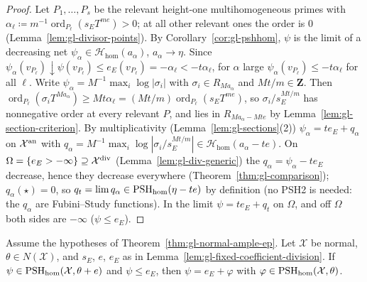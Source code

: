 \begin{proof}
Let $P_1,\dots,P_s$ be the relevant height-one multihomogeneous primes with $\alpha_\ell\coloneqq m^{-1}\operatorname{ord}_{P_\ell}(s_ET^{me})>0$; at all other relevant ones
the order is $0$ (Lemma~\ref{lem:gl-divisor-points}). By Corollary~\ref{cor:gl-pshhom}, $\psi$ is the limit of a decreasing net $\psi_\alpha\in\mathcal
H_{\mathrm{hom}}(a_\alpha)$, $a_\alpha\to\eta$. Since $\psi_\alpha(v_{P_\ell})\downarrow\psi(v_{P_\ell})\le e_E(v_{P_\ell})=-\alpha_\ell<-t\alpha_\ell$, for $\alpha$ large
$\psi_\alpha(v_{P_\ell})\le-t\alpha_\ell$ for all $\ell$. Write $\psi_\alpha=M^{-1}\max_i\log|\sigma_i|$ with $\sigma_i\in R_{Ma_\alpha}$ and $Mt/m\in\mathbf Z$. Then
$\operatorname{ord}_{P_\ell}(\sigma_iT^{Ma_\alpha})\ge Mt\alpha_\ell=(Mt/m)\operatorname{ord}_{P_\ell}(s_ET^{me})$, so $\sigma_i/s_E^{Mt/m}$ has nonnegative order at every relevant
$P$, and lies in $R_{Ma_\alpha-Mte}$ by Lemma~\ref{lem:gl-section-criterion}. By multiplicativity (Lemma~\ref{lem:gl-sections}(2)) $\psi_\alpha=te_E+q_\alpha$ on
$\mathcal X^{\mathrm{an}}$ with $q_\alpha=M^{-1}\max_i\log|\sigma_i/s_E^{Mt/m}|\in\mathcal H_{\mathrm{hom}}(a_\alpha-te)$. On $\Omega=\{e_E>-\infty\}\supseteq\mathcal X^{\mathrm{div}}$
(Lemma~\ref{lem:gl-div-generic}) the $q_\alpha=\psi_\alpha-te_E$ decrease, hence they decrease everywhere (Theorem~\ref{thm:gl-comparison}); $q_\alpha(\star)=0$, so
$q_t=\lim q_\alpha\in\operatorname{PSH}_{\mathrm{hom}}(\eta-te)$ by definition (no PSH2 is needed: the $q_\alpha$ are Fubini--Study functions). In the limit $\psi=te_E+q_t$ on
$\Omega$, and off $\Omega$ both sides are $-\infty$ ($\psi\le e_E$).
\end{proof}

\begin{theorem}\label{thm:gl-homogeneous-siu}
\leanok
{}
Assume the hypotheses of Theorem~\ref{thm:gl-normal-ample-ep}. Let $\mathcal X$ be normal, $\theta\in N(\mathcal X)$, and $s_E$, $e$, $e_E$ as in
Lemma~\ref{lem:gl-fixed-coefficient-division}. If $\psi\in\operatorname{PSH}_{\mathrm{hom}}(\mathcal X,\theta+e)$ and $\psi\le e_E$, then $\psi=e_E+\varphi$ with
$\varphi\in\operatorname{PSH}_{\mathrm{hom}}(\mathcal X,\theta)$.
\end{theorem}


